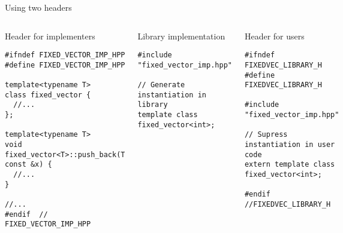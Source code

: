 \begin{frame}[t,fragile]{Using two headers}

\begin{columns}[T]

\begin{block}{Header for implementers}
\begin{lstlisting}[basicstyle=\mode<presentation>{\tiny}]
#ifndef FIXED_VECTOR_IMP_HPP
#define FIXED_VECTOR_IMP_HPP

template<typename T>
class fixed_vector {
  //...
};

template<typename T>
void 
fixed_vector<T>::push_back(T const &x) {
  //...
}

//...
#endif  // FIXED_VECTOR_IMP_HPP

\end{lstlisting}
\end{block}

\begin{block}{Library implementation}
\begin{lstlisting}[basicstyle=\mode<presentation>{\tiny}]
#include "fixed_vector_imp.hpp"

// Generate instantiation in library
template class fixed_vector<int>;
\end{lstlisting}
\end{block}

\begin{block}{Header for users}
\begin{lstlisting}[basicstyle=\mode<presentation>{\tiny}]
#ifndef FIXEDVEC_LIBRARY_H
#define FIXEDVEC_LIBRARY_H

#include "fixed_vector_imp.hpp"

// Supress instantiation in user code
extern template class fixed_vector<int>;

#endif //FIXEDVEC_LIBRARY_H
\end{lstlisting}
\end{block}

\end{columns}
\end{frame}
